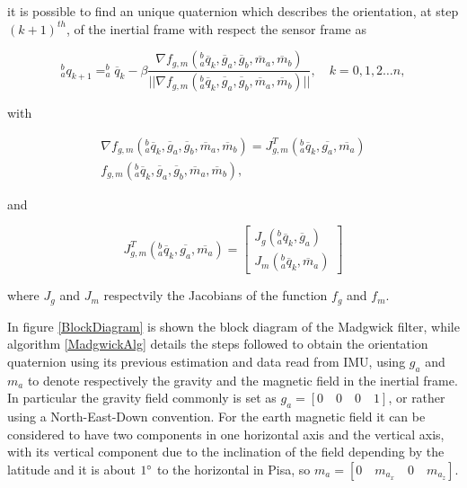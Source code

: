 \noindent it is possible to find an unique quaternion which describes the orientation, at step $(k+1)^{th}$, of the inertial frame with respect the sensor frame as

\begin{equation}
\label{eq4_15}
^b_a q_{k+1} = ^b_a \overline{q}_k - \beta \frac{\nabla f_{g,m}(^b_a \overline{q}_k,\overline{g}_a,\overline{g}_b,\overline{m}_a,\overline{m}_b) }{\vert \vert \nabla f_{g,m}(^b_a \overline{q}_k,\overline{g}_a,\overline{g}_b,\overline{m}_a,\overline{m}_b)  \vert \vert}, \quad k = 0,1,2 \dots n,
\end{equation} 

\noindent with

\begin{equation}
\begin{split}
\label{eq4_16}
\nabla f_{g,m}(^b_a \overline{q}_k,\overline{g}_a,\overline{g}_b,\overline{m}_a,\overline{m}_b) = J_{g,m}^T(^b_a \overline{q}_k, \overline{g_a},\overline{m_a}) \\ {f}_{g,m}(^b_a \overline{q}_k,\overline{g}_a,\overline{g}_b,\overline{m}_a,\overline{m}_b),
\end{split}
\end{equation}

\noindent and

\begin{equation}
\label{eq4_17}
J_{g,m}^T(^b_a \overline{q}_k, \overline{g_a}, \overline{m_a}) = \left [ \begin{array}{c} J_g(^b_a \overline{q}_k,\overline{g}_a) \\ J_m(^b_a \overline{q}_k, \overline{m}_a) \end{array} \right ]
\end{equation}
 
\noindent where $J_g$ and $J_m$ respectvily the Jacobians of the function $f_g$ and $f_m$.

In figure \ref{BlockDiagram} is shown the block diagram of the Madgwick filter, while algorithm \ref{MadgwickAlg} details the steps followed to obtain the orientation quaternion using its previous estimation and data read from IMU, using $g_a$ and $m_a$ to denote respectively the gravity and the magnetic field in the inertial frame. In particular the gravity field commonly is set as $g_a = [0 \quad 0 \quad 0 \quad 1]$, or rather using a North-East-Down convention. For the earth magnetic field it can be considered to have two components in one horizontal axis and the vertical axis, with its vertical component due to the inclination of the field depending by the latitude and it is about $1\degree$ to the horizontal in Pisa, so $m_a = [0 \quad m_{a_x} \quad 0 \quad m_{a_z}]$.

